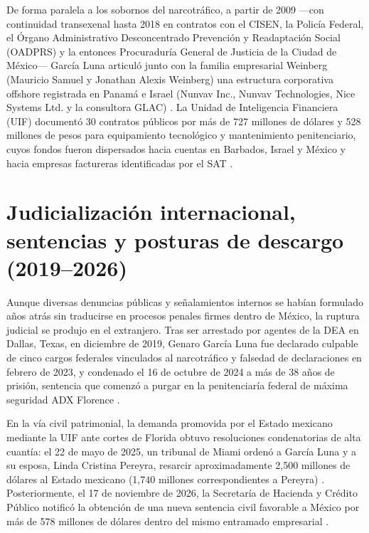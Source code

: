 De forma paralela a los sobornos del narcotráfico, a partir de 2009 ---con continuidad transexenal hasta 2018 en contratos con el CISEN, la Policía Federal, el Órgano Administrativo Desconcentrado Prevención y Readaptación Social (OADPRS) y la entonces Procuraduría General de Justicia de la Ciudad de México--- García Luna articuló junto con la familia empresarial Weinberg (Mauricio Samuel y Jonathan Alexis Weinberg) una estructura corporativa offshore registrada en Panamá e Israel (Nunvav Inc., Nunvav Technologies, Nice Systems Ltd. y la consultora GLAC) \citep{mcci2023,castilloj2026}. La Unidad de Inteligencia Financiera (UIF) documentó 30 contratos públicos por más de 727 millones de dólares y 528 millones de pesos para equipamiento tecnológico y mantenimiento penitenciario, cuyos fondos fueron dispersados hacia cuentas en Barbados, Israel y México y hacia empresas factureras identificadas por el SAT \citep{uif2024,mcci2023}.

\section{Judicialización internacional, sentencias y posturas de descargo (2019--2026)}

Aunque diversas denuncias públicas y señalamientos internos se habían formulado años atrás sin traducirse en procesos penales firmes dentro de México, la ruptura judicial se produjo en el extranjero. Tras ser arrestado por agentes de la DEA en Dallas, Texas, en diciembre de 2019, Genaro García Luna fue declarado culpable de cinco cargos federales vinculados al narcotráfico y falsedad de declaraciones en febrero de 2023, y condenado el 16 de octubre de 2024 a más de 38 años de prisión, sentencia que comenzó a purgar en la penitenciaría federal de máxima seguridad ADX Florence \citep{doj2024garcialuna}.

En la vía civil patrimonial, la demanda promovida por el Estado mexicano mediante la UIF ante cortes de Florida obtuvo resoluciones condenatorias de alta cuantía: el 22 de mayo de 2025, un tribunal de Miami ordenó a García Luna y a su esposa, Linda Cristina Pereyra, resarcir aproximadamente 2,500 millones de dólares al Estado mexicano (1,740 millones correspondientes a Pereyra) \citep{uif2025,guillen2025}. Posteriormente, el 17 de noviembre de 2026, la Secretaría de Hacienda y Crédito Público notificó la obtención de una nueva sentencia civil favorable a México por más de 578 millones de dólares dentro del mismo entramado empresarial \citep{uif2026}.

